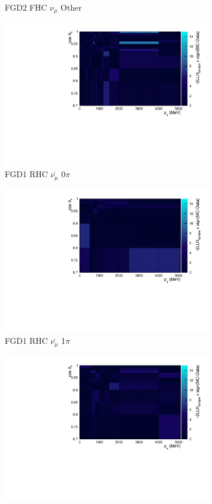 \begin{figure}
\begin{subfigure}{.32\textwidth}
  \caption{FGD2 FHC $\nu_{\mu}$ Other}
  \label{fig:llhcont_FGD2_numuCC_other}
\end{subfigure}
\centering
\begin{subfigure}{.32\textwidth}
  \centering
  \includegraphics[width=0.85\linewidth]{figs/llhcont_FGD1_anti-numuCC_0pi.pdf}
  \caption{FGD1 RHC $\bar{\nu_{\mu}}$ 0$\pi$}
  \label{fig:llhcont_FGD1_anti-numuCC_0pi}
\end{subfigure}
\begin{subfigure}{.32\textwidth}
  \centering
  \includegraphics[width=0.85\linewidth]{figs/llhcont_FGD1_anti-numuCC_1pi.pdf}
  \caption{FGD1 RHC $\bar{\nu_{\mu}}$ 1$\pi$}
  \label{fig:llhcont_FGD1_anti-numuCC_1pi}
\end{subfigure}
\begin{subfigure}{.32\textwidth}
  \centering
  \includegraphics[width=0.85\linewidth]{figs/llhcont_FGD1_anti-numuCC_other.pdf}

\end{subfigure}
\end{figure}
